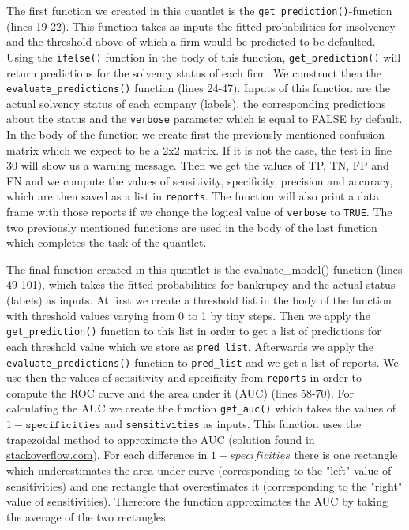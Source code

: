 \documentclass{article}
\begin{document}
The first function we created in this quantlet is the \texttt{get\_prediction()}-function (lines 19-22). This function takes as inputs the fitted probabilities for insolvency and the threshold above of which a firm would be predicted to be defaulted. Using the \texttt{ifelse()} function in the body of this function, \texttt{get\_prediction()} will return predictions for the solvency status of each firm. We construct then the \texttt{evaluate\_predictions()} function (lines 24-47). Inputs of this function are the actual solvency status of each company (labels), the corresponding predictions about the status and the \texttt{verbose} parameter which is equal to FALSE by default. In the body of the function we create first the previously mentioned confusion matrix which we expect to be a 2x2 matrix. If it is not the case, the test in line 30 will show us a warning message. Then we get the values of TP, TN, FP and FN and we compute the values of sensitivity, specificity, precision and accuracy, which are then saved as a list in \texttt{reports}. The function will also print a data frame with those reports if we change the logical value of \texttt{verbose} to \texttt{TRUE}. The two previously mentioned functions are used in the body of the last function which completes the task of the quantlet. 



The final function created in this quantlet is the evaluate\_model() function (lines 49-101), which takes the fitted probabilities for bankrupcy and the actual status (labels) as inputs. At first we create a threshold list in the body of the function with threshold values varying from 0 to 1 by tiny steps. Then we apply the \texttt{get\_prediction()} function to this list in order to get a list of predictions for each threshold value which we store as \texttt{pred\_list}. Afterwards we apply the \texttt{evaluate\_predictions()} function to \texttt{pred\_list} and we get a list of reports. We use then the values of sensitivity and specificity from \texttt{reports} in order to compute the ROC curve and the area under it (AUC) (lines 58-70). For calculating the AUC we create the function \texttt{get\_auc()} which takes the values of $1-\texttt{specificities}$ and \texttt{sensitivities} as inputs. This function uses the trapezoidal method to approximate the AUC (solution found in \href{https://stackoverflow.com/questions/4954507/calculate-the-area-under-a-curve}{stackoverflow.com}). For each difference in $1-specificities$ there is one rectangle which underestimates the area under curve (corresponding to the "left" value of sensitivities) and one rectangle that overestimates it (corresponding to the "right" value of sensitivities). Therefore the function approximates the AUC by taking the average of the two rectangles. 
\end{document}
